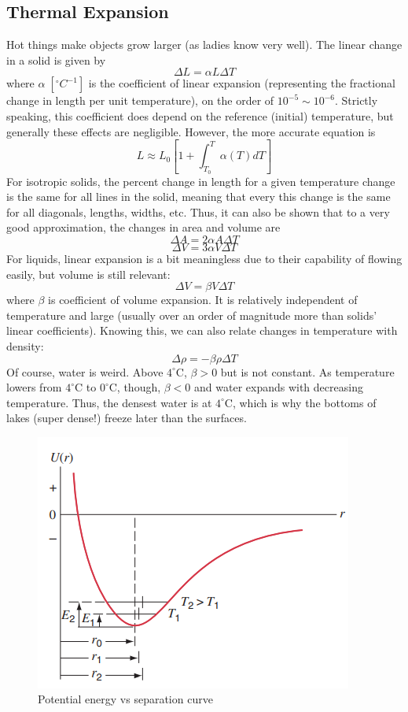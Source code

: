 \documentclass[../PhysicsFormulae.tex]{subfiles}
\begin{document}
\subsection{Thermal Expansion}
Hot things make objects grow larger (as ladies know very well). The linear change in a solid is given by 
\[ \Delta L = \alpha L \Delta T \]
where $\alpha \; [^{\circ}C^{-1}]$ is the coefficient of linear expansion (representing the fractional change in length per unit temperature), on the order of $10^{-5} \sim 10^{-6}$. Strictly speaking, this coefficient does depend on the reference (initial) temperature, but generally these effects are negligible. However, the more accurate equation is 
\[ L \approx L_0 \left[1+\int_{T_0}^{T} \alpha(T)dT\right] \]
For isotropic solids, the percent change in length for a given temperature change is the same for all lines in the solid, meaning that every this change is the same for all diagonals, lengths, widths, etc. Thus, it can also be shown that to a very good approximation, the changes in area and volume are
\[ \Delta A = 2\alpha A \Delta T \]
\[ \Delta V = 3\alpha V \Delta T \]
For liquids, linear expansion is a bit meaningless due to their capability of flowing easily, but volume is still relevant: 
\[ \Delta V = \beta V \Delta T \]
where $\beta$ is coefficient of volume expansion. It is relatively independent of temperature and large (usually over an order of magnitude more than solids' linear coefficients). Knowing this, we can also relate changes in temperature with density:
\[ \Delta \rho = - \beta \rho \Delta T \]
Of course, water is weird. Above $4^{\circ}$C, $\beta>0$ but is not constant. As temperature lowers from $4^{\circ}$C to $0^{\circ}$C, though, $\beta<0$ and water expands with decreasing temperature. Thus, the densest water is at $4^{\circ}$C, which is why the bottoms of lakes (super dense!) freeze later than the surfaces. 
\begin{figure}
	\centering
	\includegraphics[width=0.4\linewidth]{images/17.molecular_potential_energy_curve.png}
	\caption{Potential energy vs separation curve}
	\label{fig:curve}
\end{figure}
\end{document}

